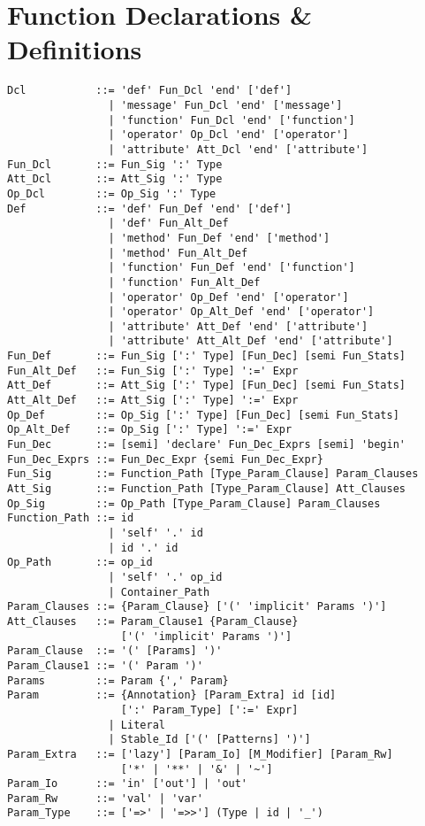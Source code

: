 \section{Function Declarations \& Definitions}
\label{sec:function-decls-defs}

\syntax\begin{lstlisting}
Dcl           ::= 'def' Fun_Dcl 'end' ['def']
                | 'message' Fun_Dcl 'end' ['message']
                | 'function' Fun_Dcl 'end' ['function']
                | 'operator' Op_Dcl 'end' ['operator']
                | 'attribute' Att_Dcl 'end' ['attribute']
Fun_Dcl       ::= Fun_Sig ':' Type
Att_Dcl       ::= Att_Sig ':' Type
Op_Dcl        ::= Op_Sig ':' Type
Def           ::= 'def' Fun_Def 'end' ['def']
                | 'def' Fun_Alt_Def
                | 'method' Fun_Def 'end' ['method']
                | 'method' Fun_Alt_Def
                | 'function' Fun_Def 'end' ['function']
                | 'function' Fun_Alt_Def
                | 'operator' Op_Def 'end' ['operator']
                | 'operator' Op_Alt_Def 'end' ['operator']
                | 'attribute' Att_Def 'end' ['attribute']
                | 'attribute' Att_Alt_Def 'end' ['attribute']
Fun_Def       ::= Fun_Sig [':' Type] [Fun_Dec] [semi Fun_Stats]
Fun_Alt_Def   ::= Fun_Sig [':' Type] ':=' Expr
Att_Def       ::= Att_Sig [':' Type] [Fun_Dec] [semi Fun_Stats]
Att_Alt_Def   ::= Att_Sig [':' Type] ':=' Expr
Op_Def        ::= Op_Sig [':' Type] [Fun_Dec] [semi Fun_Stats]
Op_Alt_Def    ::= Op_Sig [':' Type] ':=' Expr
Fun_Dec       ::= [semi] 'declare' Fun_Dec_Exprs [semi] 'begin'
Fun_Dec_Exprs ::= Fun_Dec_Expr {semi Fun_Dec_Expr}
Fun_Sig       ::= Function_Path [Type_Param_Clause] Param_Clauses
Att_Sig       ::= Function_Path [Type_Param_Clause] Att_Clauses
Op_Sig        ::= Op_Path [Type_Param_Clause] Param_Clauses
Function_Path ::= id
                | 'self' '.' id
                | id '.' id
Op_Path       ::= op_id
                | 'self' '.' op_id
                | Container_Path
Param_Clauses ::= {Param_Clause} ['(' 'implicit' Params ')']
Att_Clauses   ::= Param_Clause1 {Param_Clause} 
                  ['(' 'implicit' Params ')']
Param_Clause  ::= '(' [Params] ')'
Param_Clause1 ::= '(' Param ')'
Params        ::= Param {',' Param}
Param         ::= {Annotation} [Param_Extra] id [id]
                  [':' Param_Type] [':=' Expr]
                | Literal
                | Stable_Id ['(' [Patterns] ')']
Param_Extra   ::= ['lazy'] [Param_Io] [M_Modifier] [Param_Rw] 
                  ['*' | '**' | '&' | '~']
Param_Io      ::= 'in' ['out'] | 'out'
Param_Rw      ::= 'val' | 'var'
Param_Type    ::= ['=>' | '=>>'] (Type | id | '_')
\end{lstlisting}


